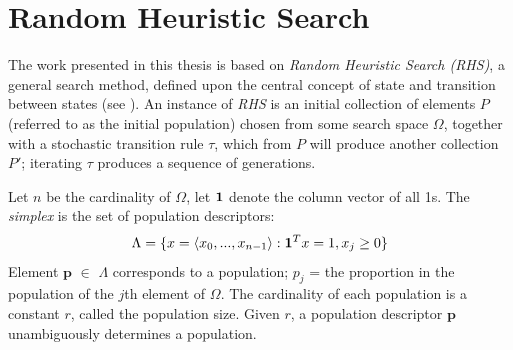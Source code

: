 \section{Random Heuristic Search}
The work presented in this thesis is based on {\em Random Heuristic Search (RHS)}, a general search method, defined upon the central concept of state and transition 
between states (see \cite{Vose1999}). An instance of {\em RHS} is an initial collection of elements $P$ (referred to as the initial population) chosen 
from some search space $\Omega$, together with a stochastic transition rule $\tau$, which from $P$ will 
produce another collection $P\prime$; iterating $\tau$ produces a sequence of generations.

Let $n$ be the cardinality 
of $\Omega$, let ${\bf1}$ denote the column vector of all 1s. 
The {\em simplex} is the set of population descriptors:
\[
\Lambda = \{x = \langle x_0,...,x_{n-1} \rangle: {\bf1}^T x=1, x_j \geq 0 \} %
\]
Element $\bm{p}$ $\in$ $\Lambda$ corresponds to a population;
$p_j$ = the proportion in the population of the $j$th element of $\Omega$. 
The cardinality of each population is a constant $r$, called the population size. 
Given $r$, a population descriptor $\bm{p}$ unambiguously determines a population.


